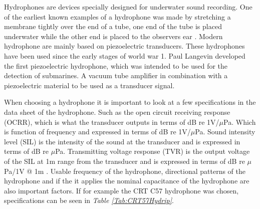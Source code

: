 Hydrophones are devices specially designed for underwater sound recording.
One of the earliest known examples of a hydrophone was made by stretching a membrane tightly over the end of a tube, one end of the tube is placed underwater while the other end is placed to the observers ear \cite{wood_a_b_textbook_1946}. 
Modern hydrophone are mainly based on piezoelectric transducers.
These hydrophones have been used since the early stages of world war 1.
Paul Langevin developed the first piezoelectric hydrophone, which was intended to be used for the detection of submarines.
A vacuum tube amplifier in combination with a piezoelectric material to be used as a transducer signal\cite{van_der_kloot_great_2014}.

When choosing a hydrophone it is important to look at a few specifications in the data sheet of the hydrophone. 
Such as the open circuit receiving response (OCRR), which is what the transducer outputs in terms of dB re 1V/$\mu$Pa.
Which is function of frequency and expressed in terms of dB re 1V/$\mu$Pa.
Sound intensity level (SIL) is the intensity of the sound at the transducer and is expressed in terms of dB re $\mu$Pa.
Transmitting voltage response (TVR) is the output voltage of the SIL at 1m range from the transducer and is expressed in terms of dB re $\mu$Pa/1V @ 1m \cite{ethem_mutlu_sozer_underwater_nodate}. 
Usable frequency of the hydrophone, directional patterns of the hydrophone and if the it applies the nominal capacitance of the hydrophone are also important factors. 
If for example the CRT C57 hydrophone was chosen, specifications can be seen in \textit{Table \ref{Tab:CRT57Hydrip}}.

\newpage

